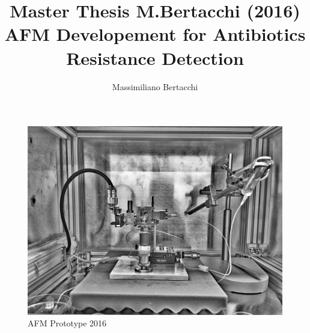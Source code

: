 \documentclass[11pt, a4paper]{article}
\begin{document}
\vspace{500pt}
\title{\normalsize\bfseries Master Thesis M.Bertacchi (2016)\\
\vspace{20pt}
\Large\bfseries AFM Developement for Antibiotics Resistance Detection
%
%
%
%
%
%
}

\author{Massimiliano Bertacchi}

%
%
%
\maketitle %

\thispagestyle{firstpage}
\vspace{0.4cm}
\begin{figure}[h] 
		\includegraphics[width=1\linewidth]{Protot_firts.jpeg}%
\caption{AFM Prototype 2016}
\end{figure}%

\end{document}
